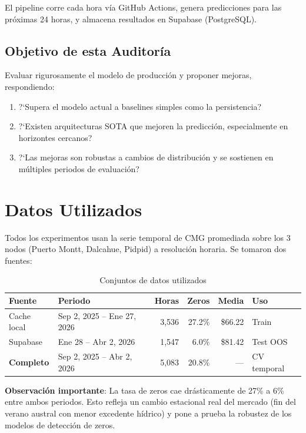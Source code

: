\documentclass[11pt,a4paper]{article}
\begin{document}
El pipeline corre cada hora v\'ia GitHub Actions, genera predicciones para las pr\'oximas 24 horas, y almacena resultados en Supabase (PostgreSQL).

\subsection{Objetivo de esta Auditor\'ia}

Evaluar rigurosamente el modelo de producci\'on y proponer mejoras, respondiendo:

\begin{enumerate}
    \item ?`Supera el modelo actual a baselines simples como la persistencia?
    \item ?`Existen arquitecturas SOTA que mejoren la predicci\'on, especialmente en horizontes cercanos?
    \item ?`Las mejoras son robustas a cambios de distribuci\'on y se sostienen en m\'ultiples periodos de evaluaci\'on?
\end{enumerate}

\section{Datos Utilizados}
\label{sec:datos}

Todos los experimentos usan la serie temporal de CMG promediada sobre los 3 nodos (Puerto Montt, Dalcahue, Pidpid) a resoluci\'on horaria. Se tomaron dos fuentes:

\begin{table}[H]
\centering
\caption{Conjuntos de datos utilizados}
\label{tab:datos}
\begin{tabular}{llrrrl}
\toprule
\textbf{Fuente} & \textbf{Periodo} & \textbf{Horas} & \textbf{Zeros} & \textbf{Media} & \textbf{Uso} \\
\midrule
Cache local & Sep 2, 2025 -- Ene 27, 2026 & 3,536 & 27.2\% & \$66.22 & Train \\
Supabase & Ene 28 -- Abr 2, 2026 & 1,547 & 6.0\% & \$81.42 & Test OOS \\
\midrule
\textbf{Completo} & Sep 2, 2025 -- Abr 2, 2026 & 5,083 & 20.8\% & --- & CV temporal \\
\bottomrule
\end{tabular}
\end{table}

\textbf{Observaci\'on importante}: La tasa de zeros cae dr\'asticamente de 27\% a 6\% entre ambos periodos. Esto refleja un cambio estacional real del mercado (fin del verano austral con menor excedente h\'idrico) y pone a prueba la robustez de los modelos de detecci\'on de zeros.
\end{document}
